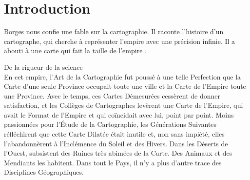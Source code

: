 





\chapter*{Introduction}
\newrefsegment








Borges nous confie une fable sur la cartographie. Il raconte l'histoire d'un cartographe, qui cherche à représenter l'empire avec une précision infinie. Il a abouti à une carte qui fait la taille de l'empire \autocite{palsky_borges_1999}.

\begin{authoredquote}
    De la rigueur de la science \\
    
    En cet empire, l'Art de la Cartographie fut poussé à une telle Perfection que la Carte d'une seule Province occupait toute une ville et la Carte de l'Empire toute une Province. Avec le temps, ces Cartes Démesurées cessèrent de donner satisfaction, et les Collèges de Cartographes levèrent une Carte de l'Empire, qui avait le Format de l'Empire et qui coïncidait avec lui, point par point. Moins passionnées pour l'Étude de la Cartographie, les Générations Suivantes réfléchirent que cette Carte Dilatée était inutile et, non sans impiété, elles l'abandonnèrent à l'Inclémence du Soleil et des Hivers. Dans les Déserts de l'Ouest, subsistent des Ruines très abimées de la Carte. Des Animaux et des Mendiants les habitent. Dans tout le Pays, il n'y a plus d'autre trace des Disciplines Géographiques.
\end{authoredquote}


